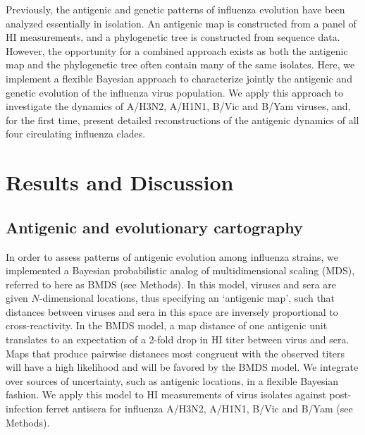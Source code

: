 \documentclass[11pt,oneside,letterpaper]{article}
\begin{document}
Previously, the antigenic and genetic patterns of influenza evolution have been analyzed essentially in isolation. 
An antigenic map is constructed from a panel of HI measurements, and a phylogenetic tree is constructed from sequence data. 
However, the opportunity for a combined approach exists as both the antigenic map and the phylogenetic tree often contain many of the same isolates. 
Here, we implement a flexible Bayesian approach to characterize jointly the antigenic and genetic evolution of the influenza virus population. 
We apply this approach to investigate the dynamics of A/H3N2, A/H1N1, B/Vic and B/Yam viruses, and, for the first time, present detailed reconstructions of the antigenic dynamics of all four circulating influenza clades.

\section*{Results and Discussion}

\subsection*{Antigenic and evolutionary cartography}

In order to assess patterns of antigenic evolution among influenza strains, we implemented a Bayesian probabilistic analog of multidimensional scaling (MDS), referred to here as BMDS (see Methods).
In this model, viruses and sera are given $N$-dimensional locations, thus specifying an `antigenic map', such that distances between viruses and sera in this space are inversely proportional to cross-reactivity.
In the BMDS model, a map distance of one antigenic unit translates to an expectation of a 2-fold drop in HI titer between virus and sera.
Maps that produce pairwise distances most congruent with the observed titers will have a high likelihood and will be favored by the BMDS model.
We integrate over sources of uncertainty, such as antigenic locations, in a flexible Bayesian fashion.
We apply this model to HI measurements of virus isolates against post-infection ferret antisera for influenza A/H3N2, A/H1N1, B/Vic and B/Yam (see Methods).
\end{document}
